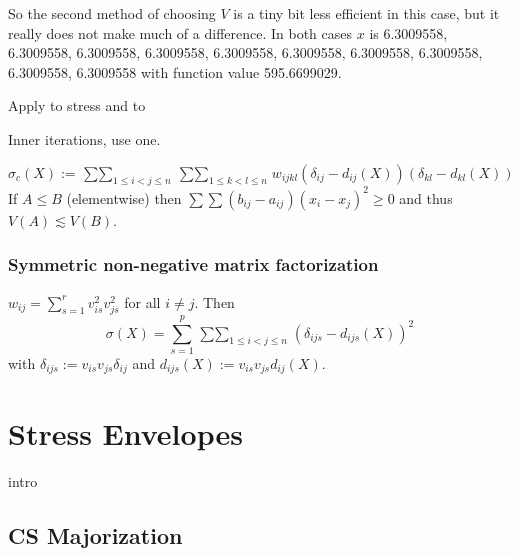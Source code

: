 \documentclass[
  12pt,
  letterpaper,
  DIV=11,
  numbers=noendperiod]{scrreprt}
\newenvironment{Shaded}{\begin{snugshade}}{\end{snugshade}}
\newcommand{\AttributeTok}[1]{\textcolor[rgb]{0.40,0.45,0.13}{#1}}
\newcommand{\DecValTok}[1]{\textcolor[rgb]{0.68,0.00,0.00}{#1}}
\newcommand{\FunctionTok}[1]{\textcolor[rgb]{0.28,0.35,0.67}{#1}}
\newcommand{\NormalTok}[1]{\textcolor[rgb]{0.00,0.23,0.31}{#1}}
\newcommand{\OtherTok}[1]{\textcolor[rgb]{0.00,0.23,0.31}{#1}}
\newcommand{\SpecialCharTok}[1]{\textcolor[rgb]{0.37,0.37,0.37}{#1}}
\theoremstyle{remark}
\begin{document}
\begin{Shaded}
\end{Shaded}

So the second method of choosing \(V\) is a tiny bit less efficient in
this case, but it really does not make much of a difference. In both
cases \(x\) is 6.3009558, 6.3009558, 6.3009558, 6.3009558, 6.3009558,
6.3009558, 6.3009558, 6.3009558, 6.3009558, 6.3009558 with function
value 595.6699029.

Apply to stress and to

Inner iterations, use one.

\[
\sigma_c(X):=\mathop{\sum\sum}_{1\leq i<j\leq n}\mathop{\sum\sum}_{1\leq k<l\leq n}w_{ijkl}(\delta_{ij}-d_{ij}(X))(\delta_{kl}-d_{kl}(X))
\] If \(A\leq B\) (elementwise) then
\(\sum\sum(b_{ij}-a_{ij})(x_i-x_j)^2\geq 0\) and thus
\(V(A)\lesssim V(B)\).

\subsubsection{Symmetric non-negative matrix
factorization}\label{symnmf}

\(w_{ij}=\sum_{s=1}^rv_{is}^2v_{js}^2\) for all \(i\not= j\). Then \[
\sigma(X)=\sum_{s=1}^p\mathop{\sum\sum}_{1\leq i<j\leq n}(
\delta_{ijs}-d_{ijs}(X))^2
\] with \(\delta_{ijs}:=v_{is}v_{js}\delta_{ij}\) and
\(d_{ijs}(X):=v_{is}v_{js}d_{ij}(X)\).

\section{Stress Envelopes}\label{propenvelopes}

intro

\subsection{CS Majorization}\label{propcsmaj}
\end{document}
